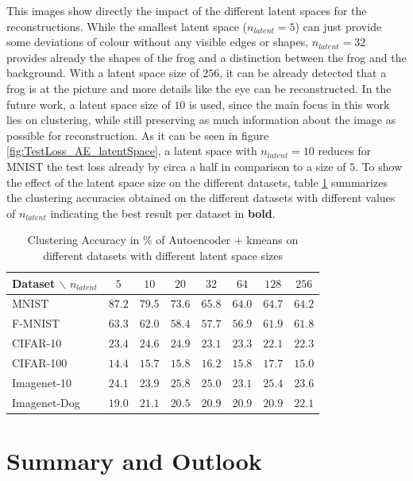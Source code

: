 \documentclass[12pt,DIV14,BCOR12mm,a4paper,footexclude,headinclude,halfparskip-,twoside,openright,openany,cleardoubleempty,idxtotoc,bibtotoc]{scrreprt} %
\numberwithin{equation}{chapter}
\begin{document}
This images show directly the impact of the different latent spaces for the reconstructions. While the smallest latent space ($n_{latent}=5$) can just provide some deviations of colour without any visible edges or shapes, $n_{latent}=32$ provides already the shapes of the frog and a distinction between the frog and the background. With a latent space size of $256$, it can be already detected that a frog is at the picture and more details like the eye can be reconstructed.
In the future work, a latent space size of $10$ is used, since the main focus in this work lies on clustering, while still preserving as much information about the image as possible for reconstruction. As it can be seen in figure \ref{fig:TestLoss_AE_latentSpace}, a latent space with $n_{latent}=10$ reduces for MNIST the test loss already by circa a half in comparison to a size of $5$. To show the effect of the latent space size on the different datasets, table \ref{tab:ClusterACC_n_latent} summarizes the clustering accuracies obtained on the different datasets with different values of $n_{latent}$ indicating the best result per dataset in \textbf{bold}.
	\begin{table}[htb!]
    		\centering
    		\caption{Clustering Accuracy in \% of Autoencoder + kmeans on different datasets with different latent space sizes}
    		\label{tab:ClusterACC_n_latent}
    		\begin{tabular}{l|ccccccc}
        		Dataset $\backslash$ $n_{latent}$ & $5$ & $10$ & $20$ & $32$ & $64$ & $128$ & $256$\\ \hline
        		MNIST & $\mathbf{87.2}$ & $79.5$ & $73.6$ & $65.8$ & $64.0$ & $64.7$ & $64.2$\\
        		F-MNIST & $\mathbf{63.3}$ & $62.0$ & $58.4$ & $57.7$ & $56.9$ & $61.9$ & $61.8$\\
        		CIFAR-10 & $23.4$ & $24.6$ & $\mathbf{24.9}$ & $23.1$ & $23.3$ & $22.1$ & $22.3$\\
        		CIFAR-100 & $14.4$ & $15.7$ & $15.8$ & $\mathbf{16.2}$ & $15.8$ & $17.7$ & $15.0$\\
        		Imagenet-10 & $24.1$ & $23.9$ & $\mathbf{25.8}$ & $25.0$ & $23.1$ & $25.4$ & $23.6$\\
        		Imagenet-Dog & $19.0$ & $21.1$ & $20.5$ & $20.9$ & $20.9$ & $20.9$ & $\mathbf{22.1}$\\
    		\end{tabular}
	\end{table}
\chapter{Summary and Outlook}
\end{document}
